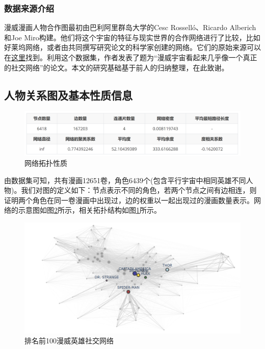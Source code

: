 \documentclass[12pt]{xjtureport}
\begin{document}
\subsubsection{数据来源介绍}

漫威漫画人物合作图最初由巴利阿里群岛大学的Cesc Rosselló、Ricardo Alberich和Joe Miro构建。他们将这个宇宙的特征与现实世界的合作网络进行了比较，比如好莱坞网络，或者由共同撰写研究论文的科学家创建的网络。它们的原始来源可以在\underline{\href{http://bioinfo.uib.es/~joemiro/marvel.html}{这里}}找到。利用这个数据集，作者发表了题为“漫威宇宙看起来几乎像一个真正的社交网络”的论文。本文的研究基础基于前人的归纳整理，在此致谢。


\subsection{人物关系图及基本性质信息}

\begin{figure}[!htbp]
    \centering
    \includegraphics[width=0.9\linewidth]{figures/网络拓扑性质.png}
    \caption{网络拓扑性质}
    \label{attributes}
\end{figure}

由数据集可知，共有漫画12651卷，角色6439个(包含平行宇宙中相同英雄不同人物)。我们对图的定义如下：节点表示不同的角色，若两个节点之间有边相连，则证明两个角色在同一卷漫画中出现过，边的权重以一起出现过的漫画数量表示。网络的示意图如图\ref{T100}所示，相关拓扑结构如图\ref{attributes}所示。

\begin{figure}[!htbp]
    \centering
    \includegraphics[width=\linewidth]{figures/top 100 Heroes Network.png}
    \caption{排名前100漫威英雄社交网络}
    \label{T100}
\end{figure}
\end{document}
